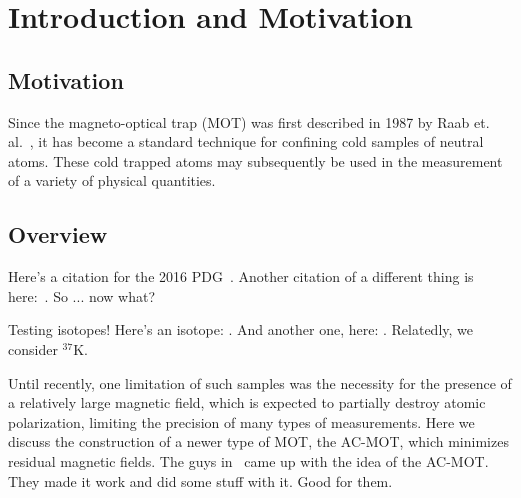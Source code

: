 
%
\chapter{Introduction and Motivation}
\label{IntroductionChapter}
\section{Motivation}
\label{motivation}
Since the magneto-optical trap (MOT) was first described in 1987 by Raab et. al.~\cite{raabprentiss}, it has become a standard technique for confining cold samples of neutral atoms.  These cold trapped atoms may subsequently be used in the measurement of a variety of physical quantities.  

\section{Overview}
\label{overview}
Here's a citation for the 2016 PDG~\cite{PDG2016}.  Another citation of a different thing is here:~\cite{Determination2014}.  So ... now what?

Testing isotopes!  Here's an isotope:  .  And another one, here:  .  Relatedly, we consider $^{37}$K.


Until recently, one limitation of such samples was the necessity for the presence of a relatively large magnetic field, which is expected to partially destroy atomic polarization, limiting the precision of many types of measurements.  Here we discuss the construction of a newer type of MOT, the AC-MOT, which minimizes residual magnetic fields.  
%
The guys in~\cite{manchester} came up with the idea of the AC-MOT.  They made it work and did some stuff with it.  Good for them.
%
